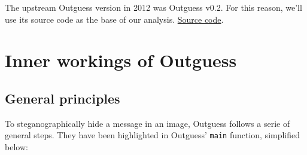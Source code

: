 \documentclass{article}
\begin{document}
The upstream Outguess version in 2012 was Outguess v0.2. For this reason, we'll use its source code as the base of our analysis. \href{https://fossies.org/linux/privat/old/outguess-0.2.tar.gz/}{Source code}.

\section{Inner workings of Outguess}

\subsection{General principles}

To steganographically hide a message in an image, Outguess follows a serie of general steps. They have been highlighted in Outguess' \texttt{main} function, simplified below:
\end{document}
